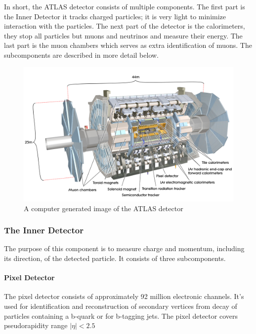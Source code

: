 \documentclass[12pt,a4paper]{article}
\numberwithin{equation}{section}
\begin{document}


In short, the ATLAS detector consists of multiple components. The first part is the Inner Detector it tracks charged particles; it is very light to minimize interaction with the particles. The next part of the detector is the calorimeters, they stop all particles but muons and neutrinos and measure their energy. The last part is the muon chambers which serves as extra identification of muons. The subcomponents  are described in more detail below. 

\begin{figure}[H]
	\centering
	\includegraphics[scale=0.1]{figures/atlas.jpg}
	\caption{A computer generated image of the ATLAS detector~\cite{detector}}\label{fig:detector}
\end{figure}

\subsubsection{The Inner Detector}
The purpose of this component is to measure charge and momentum, including its
direction, of the detected particle. It consists of three subcomponents. 
\paragraph{Pixel Detector}
The pixel detector consists of approximately 92 million electronic channels.
It's used for identification and reconstruction of secondary vertices from decay
of particles containing a b-quark or for b-tagging jets. The pixel detector
covers pseudorapidity range $|\eta| < 2.5 $
\end{document}
